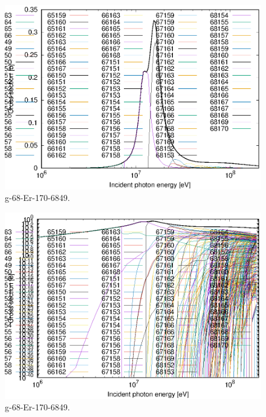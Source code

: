 \begin{figure}
 \includegraphics[width=\linewidth]{eps/g_68-Er-170_6849.eps}
  \caption{g-68-Er-170-6849.}
\end{figure}
\begin{figure}
 \includegraphics[width=\linewidth]{eps-log/g_68-Er-170_6849.eps}
 \caption{g-68-Er-170-6849.}
\end{figure}
\newpage \clearpage

